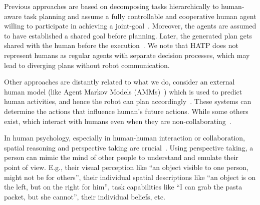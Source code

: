 \documentclass[letterpaper]{article} %
\begin{document}
Previous approaches are based on decomposing tasks hierarchically to human-aware task planning and assume a fully controllable and cooperative human agent willing to participate in achieving a joint-goal~\cite{alami2006toward,montreuil2007planning,alili2009planning,alili2009task,lallement2014hatp,de2015hatp,lallement2018hatp}. 
Moreover, the agents are assumed to have established a shared goal before planning. 
Later, the generated plan gets shared with the human before the execution~\cite{milliez2016using}.
We note that HATP does not represent humans as regular agents with separate decision processes, which may lead to diverging plans without robot communication.

Other approaches are distantly related to what we do, consider an external human model (like Agent Markov Models (AMMs)~\cite{unhelkar2020decision,UnhelkarLS19}) which is used to predict human activities, and hence the robot can plan accordingly~\cite{hoffman2007effects,unhelkar2020decision,UnhelkarLS19}. These systems can determine the actions that influence human's future actions. While some others exist, which interact with humans even when they are non-collaborating~\cite{buckingham2020robot}.



% 

In human psychology, especially in human-human interaction or collaboration, spatial reasoning and perspective taking are crucial~\cite{flavell1992perspectives,tversky1999speakers}.
Using perspective taking, a person can mimic the mind of other people to understand and emulate their point of view. 
E.g., their visual perception like ``an object visible to one person, might not be for others'', their individual spatial descriptions like ``an object is on the left, but on the right for him'', task capabilities like ``I can grab the pasta packet, but she cannot'', their individual beliefs, etc.
\end{document}
